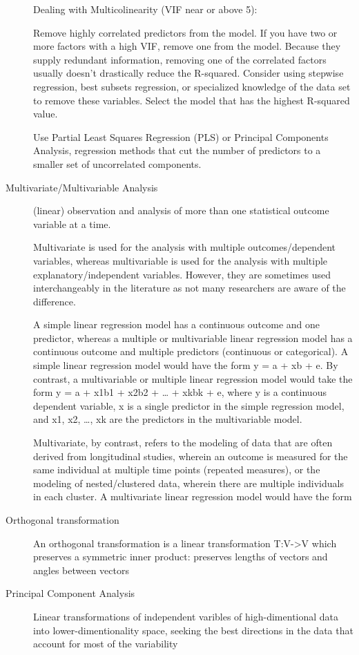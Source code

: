 \documentclass[
]{book}
\begin{document}
\begin{description}
Dealing with Multicolinearity (VIF near or above 5):

Remove highly correlated predictors from the model. If you have two or more factors with a high VIF, remove one from the model. Because they supply redundant information, removing one of the correlated factors usually doesn't drastically reduce the R-squared. Consider using stepwise regression, best subsets regression, or specialized knowledge of the data set to remove these variables. Select the model that has the highest R-squared value.

Use Partial Least Squares Regression (PLS) or Principal Components Analysis, regression methods that cut the number of predictors to a smaller set of uncorrelated components.
\item[Multivariate/Multivariable Analysis]
(linear) observation and analysis of more than one statistical outcome variable at a time.

Multivariate is used for the analysis with multiple outcomes/dependent variables, whereas multivariable is used for the analysis with multiple explanatory/independent variables. However, they are sometimes used interchangeably in the literature as not many researchers are aware of the difference.

A simple linear regression model has a continuous outcome and one predictor, whereas a multiple or multivariable linear regression model has a continuous outcome and multiple predictors (continuous or categorical). A simple linear regression model would have the form y = a + xb + e. By contrast, a multivariable or multiple linear regression model would take the form y = a + x1b1 + x2b2 + \ldots{} + xkbk + e, where y is a continuous dependent variable, x is a single predictor in the simple regression model, and x1, x2, \ldots, xk are the predictors in the multivariable model.

Multivariate, by contrast, refers to the modeling of data that are often derived from longitudinal studies, wherein an outcome is measured for the same individual at multiple time points (repeated measures), or the modeling of nested/clustered data, wherein there are multiple individuals in each cluster. A multivariate linear regression model would have the form
\item[Orthogonal transformation]
An orthogonal transformation is a linear transformation T:V-\textgreater V which preserves a symmetric inner product: preserves lengths of vectors and angles between vectors
\item[Principal Component Analysis]
Linear transformations of independent varibles of high-dimentional data into lower-dimentionality space, seeking the best directions in the data that account for most of the variability


\end{description}
\end{document}
